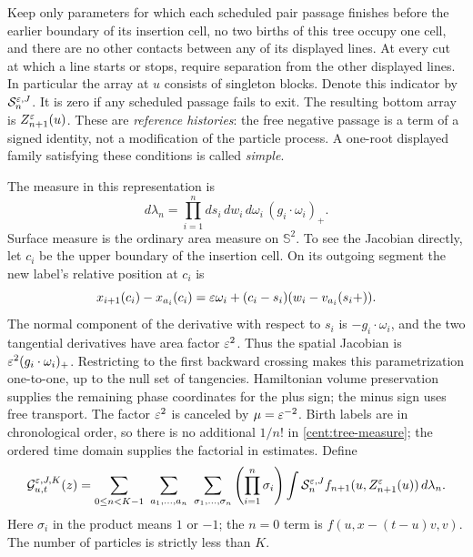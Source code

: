 Keep only parameters for which each scheduled pair passage finishes
before the earlier boundary of its insertion cell, no two births of
this tree occupy one cell, and there are no other contacts between any
of its displayed lines. At every cut at which a line starts or stops,
require separation from the other displayed lines. In particular the
array at $u$ consists of singleton blocks. Denote this indicator by
$\mathcal S_{n}^{\varepsilon,J}$. It is zero if any scheduled passage fails to
exit. The resulting bottom array is $Z_{n+1}^{\varepsilon}(u)$.
These are \emph{reference histories}: the free negative passage is a
term of a signed identity, not a modification of the particle process.
A one-root displayed family satisfying these conditions is called
\emph{simple}.

The measure in this representation is
\begin{equation}\label{cent:tree-measure}
 d\lambda_n
 =\prod_{i=1}^n ds_i\,dw_i\,d\omega_i\,
             (g_i\cdot\omega_i)_+ .
\end{equation}
Surface measure is the ordinary area measure on $\mathbb S^2$.
To see the Jacobian directly, let $c_i$ be the upper boundary of the
insertion cell. On its outgoing segment the new label's relative
position at $c_i$ is
\[
 x_{i+1}(c_i)-x_{a_i}(c_i)
   =\varepsilon\omega_i+(c_i-s_i)(w_i-v_{a_i}(s_i+)).
\]
The normal component of the derivative with respect to $s_i$ is
$-g_i\cdot\omega_i$, and the two tangential derivatives have area
factor $\varepsilon^2$. Thus the spatial Jacobian is
$\varepsilon^2(g_i\cdot\omega_i)_+$. Restricting to the first backward
crossing makes this parametrization one-to-one, up to the null
set of tangencies. Hamiltonian volume preservation supplies the
remaining phase coordinates for the plus sign; the minus sign uses
free transport. The factor $\varepsilon^2$ is canceled by
$\mu=\varepsilon^{-2}$. Birth labels are in chronological order, so there is
no additional $1/n!$ in \eqref{cent:tree-measure}; the ordered time
domain supplies the factorial in estimates. Define
\begin{equation}\label{cent:simple-sum}
 \mathcal G_{u,t}^{\varepsilon,J,K}(z)
 =\sum_{0\leq n<K-1}\ \sum_{a_1,\ldots,a_n}\
   \sum_{\sigma_1,\ldots,\sigma_n}
 \left(\prod_{i=1}^n\sigma_i\right)
 \int\mathcal S_n^{\varepsilon,J}
       f_{n+1}(u,Z_{n+1}^{\varepsilon}(u))\,d\lambda_n .
\end{equation}
Here $\sigma_i$ in the product means $1$ or $-1$; the $n=0$ term is
$f(u,x-(t-u)v,v)$. The number of particles is strictly less than $K$.

